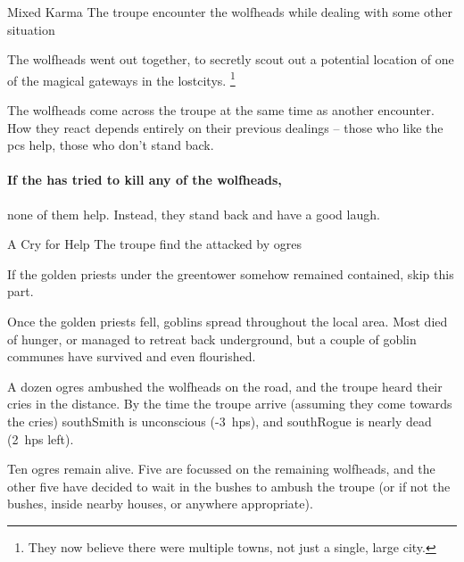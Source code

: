 {\squash Mixed Karma}%
{The troupe encounter the \glspl{wolfhead} while dealing with some other situation}%

\begin{exampletext}
  The \glspl{wolfhead} went out together, to secretly scout out a potential location of one of the magical gateways in the \glspl{lostcity}.%
  \footnote{They now believe there were multiple towns, not just a single, large city.}
\end{exampletext}

The \glspl{wolfhead} come across the troupe at the same time as another encounter.
How they react depends entirely on their previous dealings -- those who like the \glspl{pc} help, those who don't stand back.

\paragraph{If the  has tried to kill any of the \glspl{wolfhead},}
none of them help.
Instead, they stand back and have a good laugh.

{A Cry for Help}%
{The troupe find the  attacked by ogres}%

If the golden priests under the \gls{greentower} somehow remained contained, skip this part.

\begin{exampletext}
  Once the golden priests fell, goblins spread throughout the local area.
  Most died of hunger, or managed to retreat back underground, but a couple of goblin communes have survived and even flourished.
\end{exampletext}

A dozen ogres ambushed the \glspl{wolfhead} on the road, and the troupe heard their cries in the distance.
By the time the troupe arrive (assuming they come towards the cries) \gls{southSmith} is unconscious (-3~\glspl{hp}), and \gls{southRogue} is nearly dead (2~\glspl{hp} left).

Ten ogres remain alive.
Five are focussed on the remaining \glspl{wolfhead}, and the other five have decided to wait in the bushes to ambush the troupe (or if not the bushes, inside nearby houses, or anywhere appropriate).




